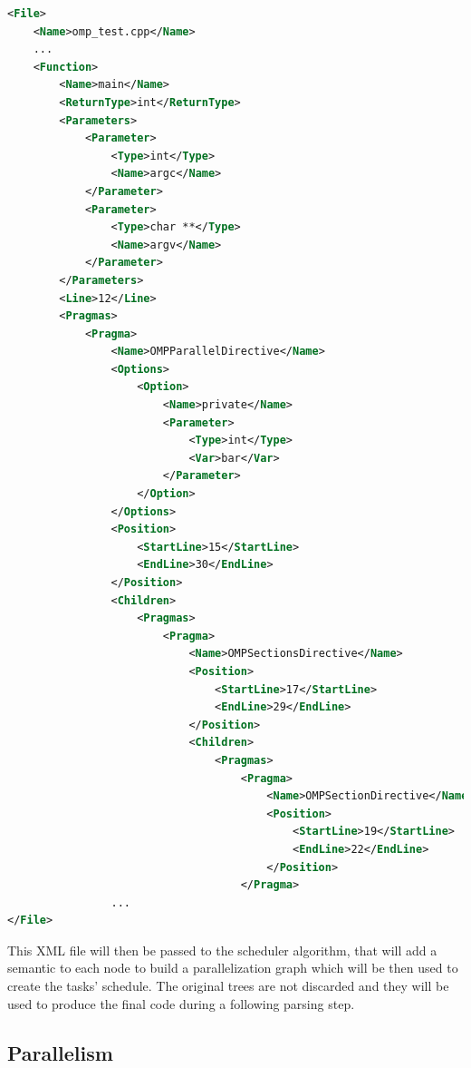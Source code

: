 \documentclass[a4paper,11pt,oneside]{book}
\begin{document}
\begin{lstlisting}[language=XML, caption=XML file of the pragma structure of Code~\ref{code}., label=xmlpragma]
<File>
    <Name>omp_test.cpp</Name>    
    ...
    <Function>
        <Name>main</Name>
        <ReturnType>int</ReturnType>
        <Parameters>
            <Parameter>
                <Type>int</Type>
                <Name>argc</Name>
            </Parameter>
            <Parameter>
                <Type>char **</Type>
                <Name>argv</Name>
            </Parameter>
        </Parameters>
        <Line>12</Line>
        <Pragmas>
            <Pragma>
                <Name>OMPParallelDirective</Name>
                <Options>
                    <Option>
                        <Name>private</Name>
                        <Parameter>
                            <Type>int</Type>
                            <Var>bar</Var>
                        </Parameter>
                    </Option>
                </Options>
                <Position>
                    <StartLine>15</StartLine>
                    <EndLine>30</EndLine>
                </Position>
                <Children>
                    <Pragmas>
                        <Pragma>
                            <Name>OMPSectionsDirective</Name>
                            <Position>
                                <StartLine>17</StartLine>
                                <EndLine>29</EndLine>
                            </Position>
                            <Children>
                                <Pragmas>
                                    <Pragma>
                                        <Name>OMPSectionDirective</Name>
                                        <Position>
                                            <StartLine>19</StartLine>
                                            <EndLine>22</EndLine>
                                        </Position>
                                    </Pragma>
				...
</File>
\end{lstlisting}

This XML file will then be passed to the scheduler algorithm, that will add a semantic to each node to build a parallelization graph  which will be then used to create the tasks’ schedule. The original trees are not discarded and they will be used to produce the final code during a following parsing step.

\subsection{Parallelism}
\label{paralelism}
\end{document}
